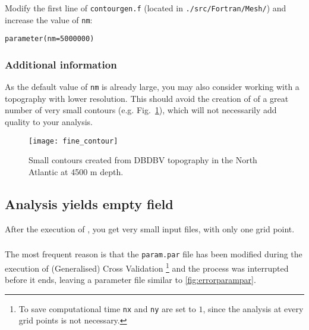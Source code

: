 Modify the first line of \texttt{contourgen.f} (located in \texttt{./src/Fortran/Mesh/}) and increase the value of \texttt{nm}:
\begin{verbatim}
parameter(nm=5000000)
\end{verbatim}

\subsubsection{Additional information}

As the default value of \texttt{nm} is already large, you may also consider working with a topography with lower resolution. This should avoid the creation of of a great number of very small contours (e.g. Fig.~\ref{fig:smallcont}), which will not necessarily add quality to your analysis.


\begin{figure}[htpb]
\centering
\parbox{.65\textwidth}{
\texttt{[image: fine\_contour]}
}\parbox{.35\textwidth}{
\caption[Small contours]{Small contours created from DBDBV topography in the North Atlantic at 4500 m depth\label{fig:smallcont}.}
}
\end{figure}
 


%





\subsection{Analysis yields empty field}


After the execution of , you get very small input files, with only one grid point.

\subsubsection{\question}

The most frequent reason is that the \texttt{param.par} file has been modified during the execution of (Generalised) Cross Validation \footnote{To save computational time \texttt{nx} and \texttt{ny} are set to $1$, since the analysis at every grid points is not necessary.} and the process was interrupted before it ends, leaving a parameter file similar to \ref{fig:errorparampar}.


